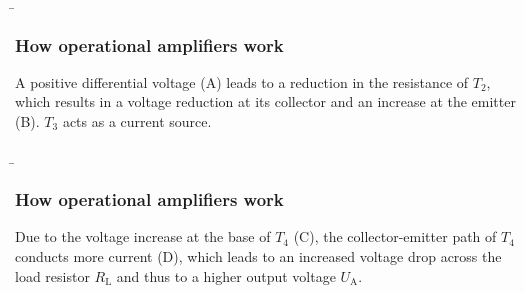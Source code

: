 \begin{frame}
    \b{ %
        \frametitle{How operational amplifiers work}
        \begin{figure}[ht]
                \centering
        \end{figure}   
        A positive differential voltage (A) leads to a reduction in the resistance of $T_2$, which results in a voltage reduction at its collector and an increase at the emitter (B). $T_3$ acts as a current source.}

\end{frame}

\begin{frame}\b{
    \frametitle{How operational amplifiers work}
    \begin{figure}[ht]
            \centering
    \end{figure}   
Due to the voltage increase at the base of $T_4$ (C), the collector-\linebreak emitter path of $T_4$ conducts more current (D), which leads to an increased voltage drop across the load resistor $R_{\text{L}}$ and thus to a higher output voltage $U_{\text{A}}$.}
\end{frame}

